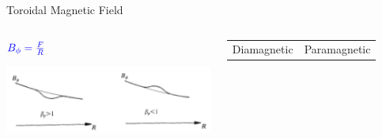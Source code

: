 \documentclass{beamer}
\begin{document}
\begin{frame}{Toroidal Magnetic Field}
\begin{columns}
\begin{center}
	$\color{blue} B_{\phi} = \frac{F}{R} $
	
	\includegraphics[width=.8\columnwidth]{btor.png}
	\end{center}
	\begin{tabular}{cc}
		\small	Diamagnetic & Paramagnetic  
 	\end{tabular}

\end{columns}	
\end{frame}
\end{document}
